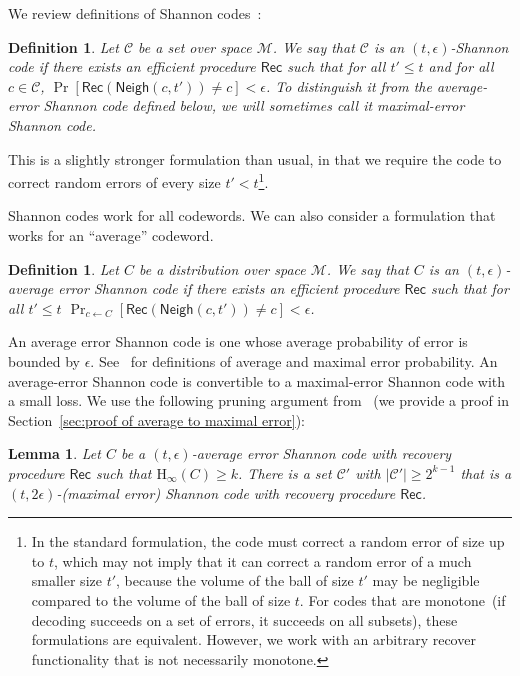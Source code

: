 \documentclass[11pt]{article}
\newcommand{\secref}[1]{\mbox{Section~\ref{#1}}}
\newcommand{\class}[1]{{\ensuremath{\mathsf{#1}}}}
\newcommand{\rec}{\ensuremath{\class{Rec}}\xspace}
\newcommand{\neigh}{\ensuremath{\class{Neigh}}\xspace}
\newcommand{\Hoo}{\mathrm{H}_\infty}
\newtheorem{lemma}[theorem]{Lemma}
\newtheorem{definition}[theorem]{Definition}
\begin{document}
We review definitions of Shannon codes~\cite{shannon1949mathematical}:
\begin{definition}
\label{def:shannon-code}
Let $\mathcal{C}$ be a set over space $\mathcal{M}$.  We say that $\mathcal{C}$ is an $(t,\epsilon)$-\emph{Shannon code} if there exists an efficient procedure $\rec$ such that for all $t'\le t$ and for all $c\in \mathcal{C}$, $\Pr[\rec(\neigh(c, t')) \neq c]<\epsilon$. To distinguish it from the average-error Shannon code defined below, we will sometimes call it \emph{maximal-error} Shannon code.
\end{definition}
This is a slightly stronger formulation than usual, in that we require the code to correct random errors of every size $t'<t$\footnote{In the standard formulation, the code must correct a random error of size up to $t$, which may not imply that it can correct a random error of a much smaller size $t'$, because the volume of the ball of size $t'$ may be negligible compared to the volume of the ball of size $t$.  For codes that are monotone~(if decoding succeeds on a set of errors, it succeeds on all subsets), these formulations are equivalent.  However, we work with an arbitrary recover functionality that is not necessarily monotone.}.  

Shannon codes work for all codewords. We can also consider a formulation that works for an ``average'' codeword. 

 \begin{definition}
Let $C$ be a distribution over space $\mathcal{M}$.  We say that $C$ is an $(t,\epsilon)$-\emph{average error Shannon code} if there exists an efficient procedure $\rec$ such that for all $t'\le t$
$\Pr_{c\leftarrow C}[\rec(\neigh(c, t')) \neq c]<\epsilon$.
\end{definition}
An average error Shannon code is one whose average probability of error is bounded by $\epsilon$.  See~\cite[Pages 192-194]{cover2006elements} for definitions of average and maximal error probability.  An average-error Shannon code is convertible to a maximal-error Shannon code with a small loss.  We use the following pruning argument from~\cite[Pages 202-204]{cover2006elements} (we provide a proof in \secref{sec:proof of average to maximal error}):
\begin{lemma}
\label{lem:averageToMaximalError}
Let $C$ be a $(t, \epsilon)$-average error Shannon code with recovery procedure $\rec$ such that $\Hoo(C)\geq k$.  There is a set $\mathcal{C}'$ with $|\mathcal{C}'|\ge2^{k-1}$ that  is a $(t, 2\epsilon)$-(maximal error) Shannon code with recovery procedure $\rec$.
\end{lemma}
\end{document}

